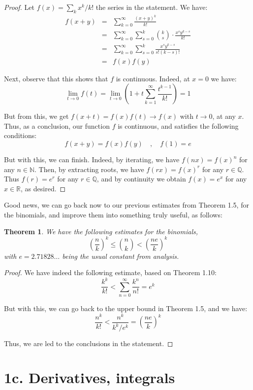 \documentclass[12pt]{amsbook}
\newtheorem{theorem}{Theorem}[chapter]
\begin{document}
\begin{proof}
Let $f(x)=\sum_kx^k/k!$ the series in the statement. We have:
\begin{eqnarray*}
f(x+y)
&=&\sum_{k=0}^\infty\frac{(x+y)^k}{k!}\\
&=&\sum_{k=0}^\infty\sum_{s=0}^k\binom{k}{s}\cdot\frac{x^sy^{k-s}}{k!}\\
&=&\sum_{k=0}^\infty\sum_{s=0}^k\frac{x^sy^{k-s}}{s!(k-s)!}\\
&=&f(x)f(y)
\end{eqnarray*}

Next, observe that this shows that $f$ is continuous. Indeed, at $x=0$ we have:
$$\lim_{t\to0}f(t)=\lim_{t\to0}\left(1+t\sum_{k=1}^\infty\frac{t^{k-1}}{k!}\right)=1$$

But from this, we get $f(x+t)=f(x)f(t)\to f(x)$ with $t\to0$, at any $x$. Thus, as a conclusion, our function $f$ is continuous, and satisfies the following conditions:
$$f(x+y)=f(x)f(y)\quad,\quad f(1)=e$$

But with this, we can finish. Indeed, by iterating, we have $f(nx)=f(x)^n$ for any $n\in\mathbb N$. Then, by extracting roots, we have $f(rx)=f(x)^r$ for any $r\in\mathbb Q$. Thus $f(r)=e^r$ for any $r\in\mathbb Q$, and by continuity we obtain $f(x)=e^x$ for any $x\in\mathbb R$, as desired.
\end{proof}

Good news, we can go back now to our previous estimates from Theorem 1.5, for the binomials, and improve them into something truly useful, as follows:

\begin{theorem}
We have the following estimates for the binomials,
$$\left(\frac{n}{k}\right)^k\leq\binom{n}{k}<\left(\frac{ne}{k}\right)^k$$
with $e=2.71828\ldots$ being the usual constant from analysis.
\end{theorem}

\begin{proof}
We have indeed the following estimate, based on Theorem 1.10:
$$\frac{k^k}{k!}<\sum_{n=0}^\infty\frac{k^n}{n!}=e^k$$

But with this, we can go back to the upper bound in Theorem 1.5, and we have:
$$\frac{n^k}{k!}<\frac{n^k}{k^k/e^k}=\left(\frac{ne}{k}\right)^k$$

Thus, we are led to the conclusions in the statement.
\end{proof}

\section*{1c. Derivatives, integrals}
\end{document}
